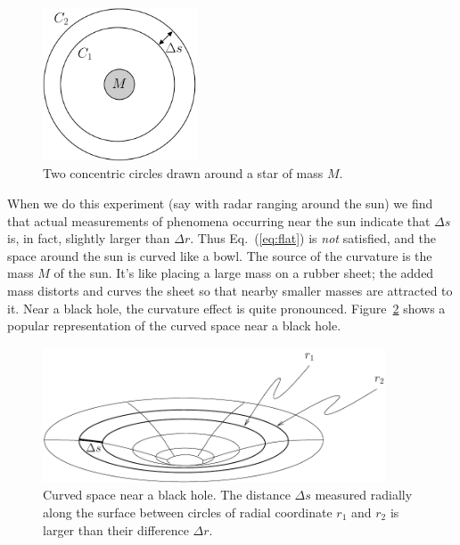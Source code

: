 \begin{figure}[t]
\begin{center}
\includegraphics[width=1.8in]{gravity_and_geometry/concentric.pdf}
\end{center}
\caption{Two concentric circles drawn around a star of mass $M$.}
\label{fig:concentric}
\end{figure}
     
When we do this experiment (say with radar ranging around the sun) we
find that actual measurements of phenomena occurring near the sun
indicate that $\Delta s$ is, in fact, slightly larger than $\Delta r$.
Thus Eq.~(\ref{eq:flat}) is {\em not} satisfied, and the space around
the sun is curved like a bowl.  The source of the curvature is the
mass $M$ of the sun.  It's like placing a large mass on a rubber
sheet; the added mass distorts and curves the sheet so that nearby
smaller masses are attracted to it.  Near a black hole, the curvature
effect is quite pronounced.  Figure~\ref{fig:curved-space} shows a
popular representation of the curved space near a black hole.
     
\begin{figure}[tbp]
\begin{center}
\includegraphics[width=4in]{gravity_and_geometry/black-hole.pdf}
\end{center}
\caption{Curved space near a black hole.  The distance $\Delta s$ measured
radially along the surface between circles of radial coordinate  $r_1$ 
and $r_2$ is larger than their  difference $\Delta r$.}
\label{fig:curved-space}
\end{figure}
     
